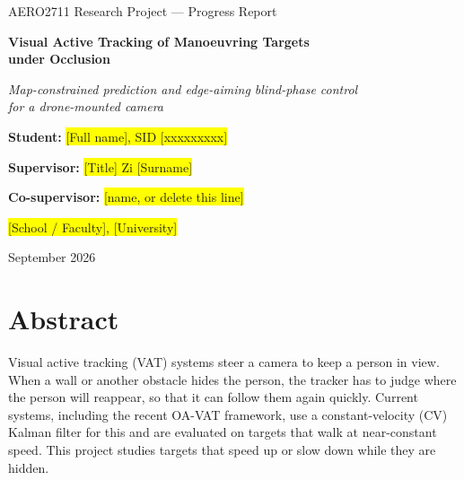 \documentclass[12pt,a4paper]{article}
\newcommand{\ph}[1]{\colorbox{yellow}{#1}}
\begin{document}
\begin{titlepage}
  \centering
  \vspace*{3cm}
  {\large\color{gray} AERO2711 Research Project --- Progress Report\par}
  \vspace{1cm}
  {\LARGE\bfseries Visual Active Tracking of Manoeuvring Targets\\ under Occlusion\par}
  \vspace{0.6cm}
  {\large\itshape Map-constrained prediction and edge-aiming blind-phase control\\ for a drone-mounted camera\par}
  \vspace{3cm}
  \textbf{Student:} \ph{[Full name], SID [xxxxxxxxx]}\par
  \textbf{Supervisor:} \ph{[Title] Zi [Surname]}\par
  \textbf{Co-supervisor:} \ph{[name, or delete this line]}\par
  \vspace{1.5cm}
  \ph{[School / Faculty], [University]}\par
  September 2026\par
\end{titlepage}

\clearpage
\section*{Abstract}
Visual active tracking (VAT) systems steer a camera to keep a person in view. When a wall or another obstacle hides the person, the tracker has to judge where the person will reappear, so that it can follow them again quickly. Current systems, including the recent OA-VAT framework, use a constant-velocity (CV) Kalman filter for this and are evaluated on targets that walk at near-constant speed. This project studies targets that speed up or slow down while they are hidden.
\end{document}
